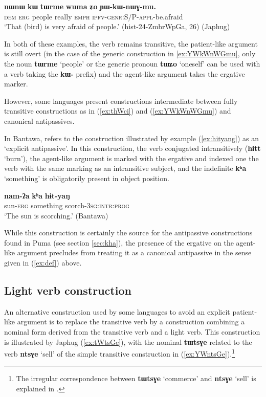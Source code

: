 \documentclass[oneside,a4paper,11pt]{article}
\newcommand{\ipa}[1]{{\phon\textbf{#1}}}
\begin{document}
\begin{exe}
\ex  \label{ex:YWkWnWGmu}
\gll
\ipa{nɯnɯ} 	\ipa{kɯ} 	\ipa{tɯrme} 	\ipa{wuma} 	\ipa{ʑo} 	\ipa{ɲɯ-kɯ-nɯɣ-mu.} \\
\textsc{dem} \textsc{erg} people really \textsc{emph} \textsc{ipfv-genr:S/P-appl}-be.afraid \\
\glt `That (bird) is very afraid of people.' (hist-24-ZmbrWpGa, 26) (Japhug)
\end{exe}

In both of these examples, the verb remains transitive, the patient-like argument is still overt (in the case of the generic construction in \ref{ex:YWkWnWGmu}, only the noun \ipa{tɯrme} `people' or the generic pronoun \ipa{tɯʑo} `oneself' can be used with a verb taking the \ipa{kɯ-} prefix)  and the agent-like argument takes the ergative marker.

However, some languages present constructions intermediate between fully transitive constructions as in (\ref{ex:thWci}) and (\ref{ex:YWkWnWGmu}) and canonical antipassives. 

In Bantawa, \citet[226;335]{doornenbal09} refers to the construction illustrated by example (\ref{ex:hityang}) as an `explicit antipassive'. In this construction, the verb conjugated intransitively (\ipa{hɨtt} `burn'), the agent-like argument is marked with the ergative and indexed one the verb with the same marking as an intransitive subject, and the indefinite \ipa{kʰa} `something' is obligatorily present in object position.

\begin{exe}
\ex \label{ex:hityang}
\gll 
\ipa{nam-ʔa} \ipa{kʰa} \ipa{hɨt-yaŋ} \\
sun-\textsc{erg} something scorch-\textsc{3sg:intr:prog} \\
\glt ‘The sun is scorching.’ (Bantawa)
\end{exe}

While this construction is certainly the source for the antipassive constructions found in Puma (see section \ref{sec:kha}), the presence of the ergative on the agent-like argument precludes from treating it as a canonical antipassive in the sense given in (\ref{ex:def}) above.

\subsection{Light verb construction} \label{sec:light}
An alternative construction used by some languages to avoid an explicit patient-like argument is to replace the transitive verb by a construction combining a nominal form derived from the transitive verb and a light verb. This construction is illustrated by Japhug (\ref{ex:tWtsGe}), with the nominal \ipa{tɯtsɣe} related to the verb \ipa{ntsɣe} `sell' of the simple transitive construction in (\ref{ex:YWntsGe}).\footnote{The irregular correspondence between \ipa{tɯtsɣe} `commerce' and \ipa{ntsɣe} `sell' is explained in \citet{jacques14antipassive}. }
\end{document}
